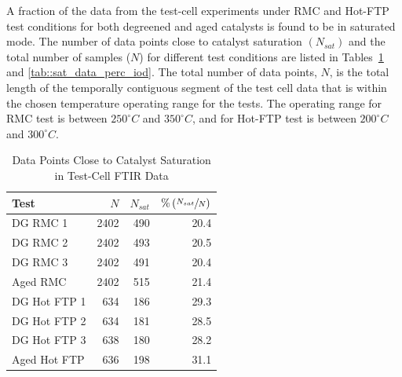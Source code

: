 \documentclass[subscriptcorrection,upint,varvw,barcolor=Goldenrod3,mathalfa=cal=euler,balance,hyphenate,french,pdf-a]{asmejour}
\newcommand{\lr}[1]{\left( #1 \right)}
\begin{document}
A fraction of the data from the test-cell experiments under RMC and Hot-FTP test conditions for both degreened and aged
catalysts is found to be in saturated mode. The number of data points close to catalyst saturation $\lr{N_{sat}}$ and
the total number of samples ($N$) for different test conditions are listed in Tables~\ref{tab::sat_data_perc_ssd} and
\ref{tab::sat_data_perc_iod}. The total number of data points, $N$, is the total length of the temporally contiguous
segment of the test cell data that is within the chosen temperature operating range for the tests. The operating range
for RMC test is between $250^\circ C$ and $350^\circ C$, and for Hot-FTP test is between $200^\circ C$ and $300^\circ
    C$.
\begin{table}[ht]
    \centering
    \caption{Data Points Close to Catalyst Saturation in Test-Cell FTIR Data}
    \label{tab::sat_data_perc_ssd}
    \begin{tabular}{l r r r}
        \hline \hline
        Test         & $N$  & $N_{sat}$ & $\% \lr{ \sfrac{N_{sat}}{N} }$ \\\hline \hline
        DG RMC 1     & 2402 & 490       & 20.4                           \\
        DG RMC 2     & 2402 & 493       & 20.5                           \\
        DG RMC 3     & 2402 & 491       & 20.4                           \\
        Aged RMC     & 2402 & 515       & 21.4                           \\ \hline
        DG Hot FTP 1 & 634  & 186       & 29.3                           \\
        DG Hot FTP 2 & 634  & 181       & 28.5                           \\
        DG Hot FTP 3 & 638  & 180       & 28.2                           \\
        Aged Hot FTP & 636  & 198       & 31.1                           \\
        \hline\hline
    \end{tabular}
\end{table}
\end{document}
